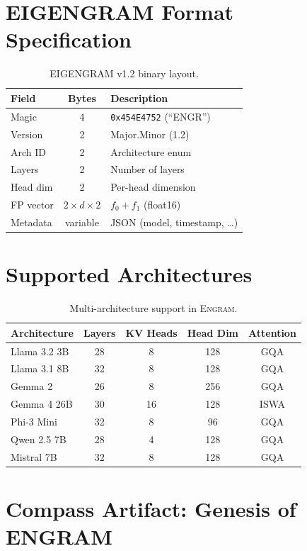 \documentclass[11pt,twocolumn]{article}
\newcommand{\engram}{\textsc{Engram}}
\begin{document}
\section{EIGENGRAM Format Specification}
\label{app:eigengram}

\begin{table}[H]
\centering
\caption{EIGENGRAM v1.2 binary layout.}
\small
\begin{tabular}{lcl}
\toprule
Field & Bytes & Description \\
\midrule
Magic & 4 & \texttt{0x454E4752} (``ENGR'') \\
Version & 2 & Major.Minor (1.2) \\
Arch ID & 2 & Architecture enum \\
Layers & 2 & Number of layers \\
Head dim & 2 & Per-head dimension \\
FP vector & $2 \times d \times 2$ & $f_0{+}f_1$ (float16) \\
Metadata & variable & JSON (model, timestamp, \ldots) \\
\bottomrule
\end{tabular}
\end{table}

\section{Supported Architectures}
\label{app:architectures}

\begin{table}[H]
\centering
\caption{Multi-architecture support in \engram{}.}
\small
\begin{tabular}{lcccc}
\toprule
Architecture & Layers & KV Heads & Head Dim & Attention \\
\midrule
Llama 3.2 3B & 28 & 8 & 128 & GQA \\
Llama 3.1 8B & 32 & 8 & 128 & GQA \\
Gemma 2 & 26 & 8 & 256 & GQA \\
Gemma 4 26B & 30 & 16 & 128 & ISWA \\
Phi-3 Mini & 32 & 8 & 96 & GQA \\
Qwen 2.5 7B & 28 & 4 & 128 & GQA \\
Mistral 7B & 32 & 8 & 128 & GQA \\
\bottomrule
\end{tabular}
\end{table}

\section{Compass Artifact: Genesis of ENGRAM}
\label{app:genesis}
\end{document}
